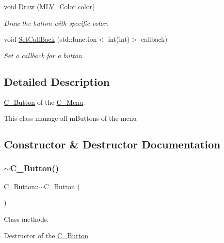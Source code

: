 \begin{DoxyCompactItemize}
void \hyperlink{classC__Button_a6c507d4567ca21676e9980f8cf3d26b5}{Draw} (M\+L\+V\+\_\+\+Color color)
\begin{DoxyCompactList}\small\item\em Draw the button with specific color. \end{DoxyCompactList}\item 
void \hyperlink{classC__Button_aedb01f3229d8176f6a9475cf2edae8f0}{Set\+Call\+Back} (std\+::function$<$ int(int)$>$ callback)
\begin{DoxyCompactList}\small\item\em Set a callback for a button. \end{DoxyCompactList}\end{DoxyCompactItemize}


\subsection{Detailed Description}
\hyperlink{classC__Button}{C\+\_\+\+Button} of the \hyperlink{classC__Menu}{C\+\_\+\+Menu}. 

This class manage all m\+Buttons of the menu 

\subsection{Constructor \& Destructor Documentation}
\mbox{\label{classC__Button_a8581fb2ad14e232e97040388bdc992e4}} 
\subsubsection{\texorpdfstring{$\sim$\+C\+\_\+\+Button()}{~C\_Button()}}
{\footnotesize\ttfamily C\+\_\+\+Button\+::$\sim$\+C\+\_\+\+Button (\begin{DoxyParamCaption}{ }\end{DoxyParamCaption})\hspace{0.3cm}{\ttfamily [default]}}



Class methods. 

Destructor of the \hyperlink{classC__Button}{C\+\_\+\+Button} \mbox{\label{classC__Button_a39291cec8e3a327343328f6fa1a3b3d9}} 
